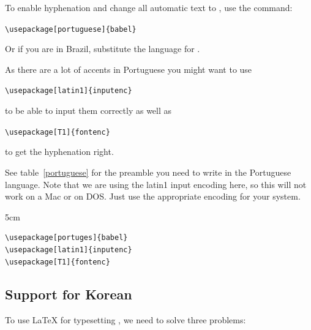 \documentclass[twoside,letterpaper,11pt]{article}
\begin{document}
To enable hyphenation and change all automatic text to ,
 use the command:
\begin{lscommand}
\verb|\usepackage[portuguese]{babel}|
\end{lscommand}
Or if you are in Brazil, substitute the language for .

As there are a lot of accents in Portuguese you might want to use
\begin{lscommand}
\verb|\usepackage[latin1]{inputenc}|
\end{lscommand}
to be able to input them correctly as well as 
\begin{lscommand}
\verb|\usepackage[T1]{fontenc}|
\end{lscommand}
to get the hyphenation right.

See table~\ref{portuguese} for the preamble you need to write in the
Portuguese language. Note that we are using the latin1 input encoding here,
so this will not work on a Mac or on DOS. Just use
the appropriate encoding for your system.

\begin{table}[btp]
\caption{Preamble forPortuguese documents.} \label{portuguese}
\begin{lined}{5cm}
\begin{verbatim}
\usepackage[portuges]{babel}
\usepackage[latin1]{inputenc}
\usepackage[T1]{fontenc}
\end{verbatim}
\bigskip
\end{lined}
\end{table}

\subsection[Support for Korean]{Support for Korean\footnotemark}\label{support_korean}%

To use \LaTeX{} for typesetting  , 
we need to solve three problems: 
\end{document}
